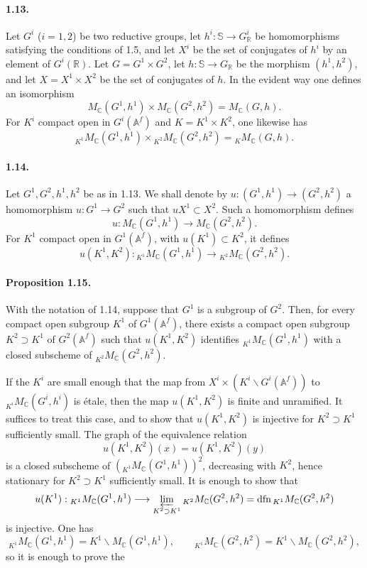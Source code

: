 \documentclass[10pt]{article}
\newcommand{\Af}{\mathbb A^f}
\newcommand{\C}{\mathbb C}
\newcommand{\R}{\mathbb R}
\newcommand{\bS}{\mathbb S}
\newcommand{\dfn}{\operatorname{dfn}}
\newcommand{\limproj}{\varprojlim}
\newcommand{\MC}{M_{\C}}
\begin{document}
\paragraph{1.13.} Let $G^i$ ($i=1,2$) be two reductive groups, let $h^i:\bS\to G^i_\R$ be homomorphisms satisfying the conditions of 1.5, and let $X^i$ be the set of conjugates of $h^i$ by an element of $G^i(\R)$. Let $G=G^1\times G^2$, let $h:\bS\to G_\R$ be the morphism $(h^1,h^2)$, and let $X=X^1\times X^2$ be the set of conjugates of $h$. In the evident way one defines an isomorphism
\[
\MC(G^1,h^1)\times\MC(G^2,h^2)=\MC(G,h). \tag{1.13.1}
\]
For $K^i$ compact open in $G^i(\Af)$ and $K=K^1\times K^2$, one likewise has
\[
{}_{K^1}\MC(G^1,h^1)\times{}_{K^2}\MC(G^2,h^2)={}_K\MC(G,h). \tag{1.13.2}
\]

\paragraph{1.14.} Let $G^1,G^2,h^1,h^2$ be as in 1.13. We shall denote by $u:(G^1,h^1)\to(G^2,h^2)$ a homomorphism $u:G^1\to G^2$ such that $uX^1\subset X^2$. Such a homomorphism defines
\[
u:\MC(G^1,h^1)\longrightarrow\MC(G^2,h^2). \tag{1.14.1}
\]
For $K^1$ compact open in $G^1(\Af)$, with $u(K^1)\subset K^2$, it defines
\[
u(K^1,K^2):{}_{K^1}\MC(G^1,h^1)\longrightarrow{}_{K^2}\MC(G^2,h^2). \tag{1.14.2}
\]

\paragraph{Proposition 1.15.} With the notation of 1.14, suppose that $G^1$ is a subgroup of $G^2$. Then, for every compact open subgroup $K^1$ of $G^1(\Af)$, there exists a compact open subgroup $K^2\supset K^1$ of $G^2(\Af)$ such that $u(K^1,K^2)$ identifies ${}_{K^1}\MC(G^1,h^1)$ with a closed subscheme of ${}_{K^2}\MC(G^2,h^2)$.

If the $K^i$ are small enough that the map from $X^i\times(K^i\backslash G^i(\Af))$ to ${}_{K^i}\MC(G^i,h^i)$ is étale, then the map $u(K^1,K^2)$ is finite and unramified. It suffices to treat this case, and to show that $u(K^1,K^2)$ is injective for $K^2\supset K^1$ sufficiently small. The graph of the equivalence relation
\[
u(K^1,K^2)(x)=u(K^1,K^2)(y)
\]
is a closed subscheme of $({}_{K^1}\MC(G^1,h^1))^2$, decreasing with $K^2$, hence stationary for $K^2\supset K^1$ sufficiently small. It is enough to show that
\[
u(K^1):{}_{K^1}\MC(G^1,h^1)\longrightarrow\limproj_{K^2\supset K^1}{}_{K^2}\MC(G^2,h^2)=\dfn{}_{K^1}\MC(G^2,h^2)
\]
is injective. One has
\[
{}_{K^1}\MC(G^1,h^1)=K^1\backslash \MC(G^1,h^1),
\qquad
{}_{K^1}\MC(G^2,h^2)=K^1\backslash \MC(G^2,h^2),
\]
so it is enough to prove the
\end{document}
